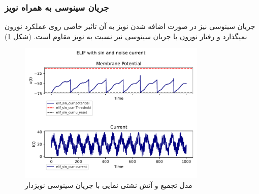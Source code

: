 \documentclass{article}
\begin{document}
            \subsubsection{جریان سینوسی به همراه نویز}
                جریان سینوسی نیز در صورت اضافه شدن نویز به آن تاثیر خاصی روی عملکرد نورون نمیگذارد و رفتار نورون با جریان سینوسی نیز نسبت به نویز مقاوم است.
                (شکل \ref{fig:elif-sin-noise-curr})
                \begin{figure}[H]
                    \centering
                    \includegraphics[width=0.8\textwidth]{plots/ELIF with sin and noise current.pdf} 
                    \caption{مدل تجمیع و آتش نشتی نمایی با جریان سینوسی  نویزدار  }
                    \label{fig:elif-sin-noise-curr}
                \end{figure}
\end{document}
